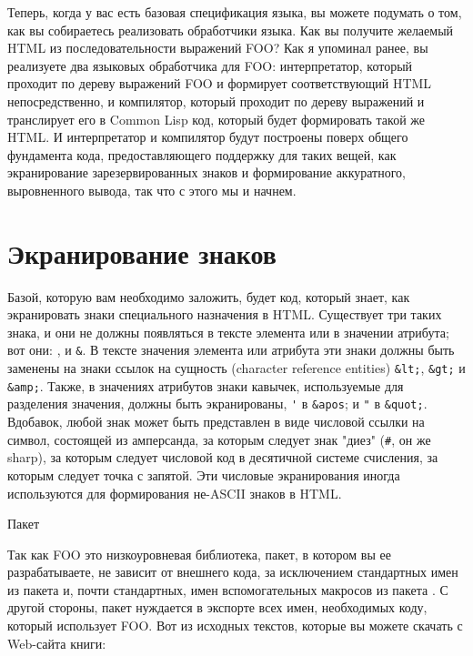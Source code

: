 Теперь, когда у вас есть базовая спецификация языка, вы можете подумать о том, как вы
собираетесь реализовать обработчики языка. Как вы получите желаемый HTML из
последовательности выражений FOO? Как я упоминал ранее, вы реализуете два языковых
обработчика для FOO: интерпретатор, который проходит по дереву выражений FOO и формирует
соответствующий HTML непосредственно, и компилятор, который проходит по дереву выражений и
транслирует его в Common Lisp код, который будет формировать такой же HTML. И
интерпретатор и компилятор будут построены поверх общего фундамента кода, предоставляющего
поддержку для таких вещей, как экранирование зарезервированных знаков и формирование
аккуратного, выровненного вывода, так что с этого мы и начнем.

\section{Экранирование знаков}

Базой, которую вам необходимо заложить, будет код, который знает, как экранировать знаки
специального назначения в HTML. Существует три таких знака, и они не должны появляться в
тексте элемента или в значении атрибута; вот они: \code{<}, \code{>} и \lstinline!&!. В
тексте значения элемента или атрибута эти знаки должны быть заменены на знаки ссылок на
сущность (character reference entities) \lstinline!&lt;!, \lstinline!&gt;! и
\lstinline!&amp;!. Также, в значениях атрибутов знаки кавычек, используемые для разделения
значения, должны быть экранированы, \lstinline!'! в \lstinline!&apos!; и \lstinline!"! в
\lstinline!&quot;!. Вдобавок, любой знак может быть представлен в виде числовой ссылки на
символ, состоящей из амперсанда, за которым следует знак "диез" (\lstinline!#!, он же
sharp), за которым следует числовой код в десятичной системе счисления, за которым следует
точка с запятой. Эти числовые экранирования иногда используются для формирования не-ASCII
знаков в HTML.


Пакет 

Так как FOO это низкоуровневая библиотека, пакет, в котором вы ее разрабатываете, не
зависит от внешнего кода, за исключением стандартных имен из пакета  и,
почти стандартных, имен вспомогательных макросов из пакета
. С другой стороны, пакет нуждается в экспорте всех
имен, необходимых коду, который использует FOO. Вот  из исходных текстов,
которые вы можете скачать с Web-сайта книги:

